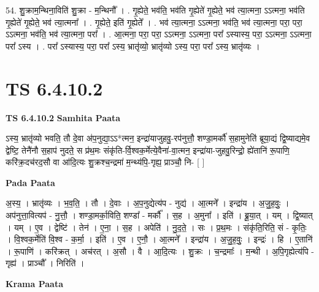 \documentclass[17pt]{extarticle}
\begin{document}
54. शु॒क्राम॒न्थिना॒विति॑ शु॒क्रा - म॒न्थिनौ᳚ । . गृ॒ह्येते॒ भव॑ति॒ भव॑ति गृ॒ह्येते॑ गृ॒ह्येते॒ भव॑ त्या॒त्मना॒ ऽऽत्मना॒ भव॑ति गृ॒ह्येते॑ गृ॒ह्येते॒ भव॑ त्या॒त्मना᳚ । . गृ॒ह्येते॒ इति॑ गृ॒ह्येते᳚ । . भव॑ त्या॒त्मना॒ ऽऽत्मना॒ भव॑ति॒ भव॑ त्या॒त्मना॒ परा॒ परा॒ ऽऽत्मना॒ भव॑ति॒ भव॑ त्या॒त्मना॒ परा᳚ । . आ॒त्मना॒ परा॒ परा॒ ऽऽत्मना॒ ऽऽत्मना॒ परा᳚ ऽस्यास्य॒ परा॒ ऽऽत्मना॒ ऽऽत्मना॒ परा᳚ ऽस्य । . परा᳚ ऽस्यास्य॒ परा॒ परा᳚ ऽस्य॒ भ्रातृ॑व्यो॒ भ्रातृ॑व्यो ऽस्य॒ परा॒ परा᳚ ऽस्य॒ भ्रातृ॑व्यः । \newline
\pagebreak
{}

\section{ TS 6.4.10.2 }

\textbf{TS 6.4.10.2 } \newline
\textbf{Samhita Paata} \newline

ऽस्य॒ भ्रातृ॑व्यो भवति॒ तौ दे॒वा अ॑प॒नुद्या॒ऽऽ*त्मन॒ इन्द्रा॑याजुहवु॒-रप॑नुत्तौ॒ शण्डा॒मर्कौ॑ स॒हामुनेति॑ ब्रूया॒द्यं द्वि॒ष्याद्यमे॒व द्वेष्टि॒ तेनै॑नौ स॒हाप॑ नुदते॒ स प्र॑थ॒मः संकृ॑ति-र्वि॒श्वक॒र्मेत्ये॒वैना॑-वा॒त्मन॒ इन्द्रा॑या-जुहवु॒रिन्द्रो॒ ह्ये॑तानि॑ रू॒पाणि॒ करि॑क्र॒दच॑रद॒सौ वा आ॑दि॒त्यः शु॒क्रश्च॒न्द्रमा॑ म॒न्थ्य॑पि॒-गृह्य॒ प्राञ्चौ॒ नि- [  ] \newline

\textbf{Pada Paata} \newline

अ॒स्य॒ । भ्रातृ॑व्यः । भ॒व॒ति॒ । तौ । दे॒वाः । अ॒प॒नुद्येत्य॑प - नुद्य॑ । आ॒त्मने᳚ । इन्द्रा॑य । अ॒जु॒ह॒वुः॒ । अप॑नुत्ता॒वित्यप॑ - नु॒त्तौ॒ । शण्डा॒मर्का॒विति॒ शण्डा᳚ - मर्कौ᳚ । स॒ह । अ॒मुना᳚ । इति॑ । ब्रू॒या॒त् । यम् । द्वि॒ष्यात् । यम् । ए॒व । द्वेष्टि॑ । तेन॑ । ए॒ना॒ । स॒ह । अपेति॑ । नु॒द॒ते॒ । सः । प्र॒थ॒मः । संकृ॑ति॒रिति॒ सं - कृ॒तिः॒ । वि॒श्वक॒र्मेति॑ वि॒श्व - क॒र्मा॒ । इति॑ । ए॒व । ए॒नौ॒ । आ॒त्मने᳚ । इन्द्रा॑य । अ॒जु॒ह॒वुः॒ । इन्द्रः॑ । हि । ए॒तानि॑ । रू॒पाणि॑ । करि॑क्रत् । अच॑रत् । अ॒सौ । वै । आ॒दि॒त्यः । शु॒क्रः । च॒न्द्रमाः᳚ । म॒न्थी । अ॒पि॒गृह्येत्य॑पि - गृह्य॑ । प्राञ्चौ᳚ । निरिति॑ ।  \newline


\textbf{Krama Paata} \newline
\end{document}
